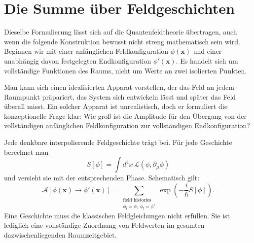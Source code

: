 \begin{classroomqa}
\end{classroomqa}

\section{Die Summe über Feldgeschichten}

Dieselbe Formulierung lässt sich auf die Quantenfeldtheorie übertragen, auch wenn die folgende Konstruktion bewusst nicht streng mathematisch sein wird. Beginnen wir mit einer anfänglichen Feldkonfiguration \(\phi(\mathbf{x})\) und einer unabhängig davon festgelegten Endkonfiguration \(\phi'(\mathbf{x})\). Es handelt sich um vollständige Funktionen des Raums, nicht um Werte an zwei isolierten Punkten.

Man kann sich einen idealisierten Apparat vorstellen, der das Feld an jedem Raumpunkt präpariert, das System sich entwickeln lässt und später das Feld überall misst. Ein solcher Apparat ist unrealistisch, doch er formuliert die konzeptionelle Frage klar: Wie groß ist die Amplitude für den Übergang von der vollständigen anfänglichen Feldkonfiguration zur vollständigen Endkonfiguration?

Jede denkbare interpolierende Feldgeschichte trägt bei. Für jede Geschichte berechnet man
\begin{equation}
S[\phi]=\int d^4x\,\mathcal{L}(\phi,\partial_\mu\phi)
\end{equation}
und versieht sie mit der entsprechenden Phase. Schematisch gilt:
\begin{equation}
\mathcal{A}\!\left[\phi(\mathbf{x})\rightarrow\phi'(\mathbf{x})\right]
=
\sum_{\substack{\text{field histories}\\
\phi_{\mathrm{i}}=\phi,\;\phi_{\mathrm{f}}=\phi'}}
\exp\!\left(-\frac{i}{\hbar}S[\phi]\right).
\end{equation}
Eine Geschichte muss die klassischen Feldgleichungen nicht erfüllen. Sie ist lediglich eine vollständige Zuordnung von Feldwerten im gesamten dazwischenliegenden Raumzeitgebiet.

